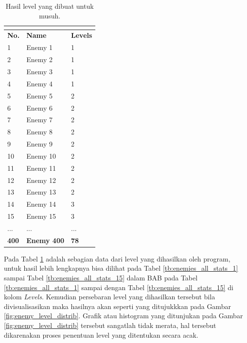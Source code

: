 \begin{longtable}{|l|l|l|}
	\caption{Hasil level yang dibuat untuk musuh.}
	\vspace{1ex}
	\label{tb:enemy_level_distrib}\\
	\hline
	\rowcolor[HTML]{C0C0C0} 
	\textbf{No.} & \textbf{Name} & \textbf{Levels} \\ \hline
	1 & Enemy 1 & 1 \\ \hline
	2 & Enemy 2 & 1 \\ \hline
	3 & Enemy 3 & 1 \\ \hline
	4 & Enemy 4 & 1 \\ \hline
	5 & Enemy 5 & 2 \\ \hline
	6 & Enemy 6 & 2 \\ \hline
	7 & Enemy 7 & 2 \\ \hline
	8 & Enemy 8 & 2 \\ \hline
	9 & Enemy 9 & 2 \\ \hline
	10 & Enemy 10 & 2 \\ \hline
	11 & Enemy 11 & 2 \\ \hline
	12 & Enemy 12 & 2 \\ \hline
	13 & Enemy 13 & 2 \\ \hline
	14 & Enemy 14 & 3 \\ \hline
	15 & Enemy 15 & 3 \\ \hline
	... & ... & ... \\ \hline
	\textbf{400} & \textbf{Enemy 400} & \textbf{78} \\ \hline
\end{longtable}
\vspace{1ex}

Pada Tabel \ref{tb:enemy_level_distrib} adalah sebagian data dari level yang dihasilkan oleh program, untuk hasil lebih lengkapnya bisa dilihat pada Tabel \ref{tb:enemies_all_stats_1} sampai Tabel \ref{tb:enemies_all_stats_15} dalam BAB  pada Tabel \ref{tb:enemies_all_stats_1} sampai dengan Tabel \ref{tb:enemies_all_stats_15} di kolom \textit{Levels}. Kemudian persebaran level yang dihasilkan tersebut bila divisualisasikan maka hasilnya akan seperti yang ditujukkkan pada Gambar \ref{fig:enemy_level_distrib}. Grafik atau histogram yang ditunjukan pada Gambar \ref{fig:enemy_level_distrib} tersebut sangatlah tidak merata, hal tersebut dikarenakan proses penentuan level yang ditentukan secara acak.

